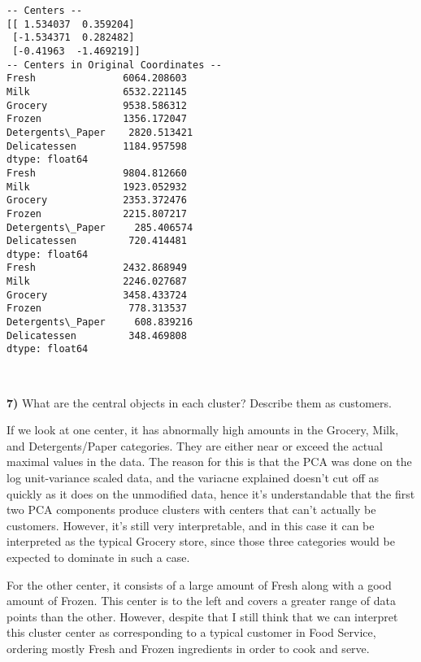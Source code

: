 \documentclass{article}
\begin{document}
    \begin{Verbatim}[commandchars=\\\{\}]
-- Centers --
[[ 1.534037  0.359204]
 [-1.534371  0.282482]
 [-0.41963  -1.469219]]
-- Centers in Original Coordinates --
Fresh               6064.208603
Milk                6532.221145
Grocery             9538.586312
Frozen              1356.172047
Detergents\_Paper    2820.513421
Delicatessen        1184.957598
dtype: float64
Fresh               9804.812660
Milk                1923.052932
Grocery             2353.372476
Frozen              2215.807217
Detergents\_Paper     285.406574
Delicatessen         720.414481
dtype: float64
Fresh               2432.868949
Milk                2246.027687
Grocery             3458.433724
Frozen               778.313537
Detergents\_Paper     608.839216
Delicatessen         348.469808
dtype: float64
    \end{Verbatim}

    \begin{center}
    \end{center}
    { \hspace*{\fill} \\}
    
    \textbf{7)} What are the central objects in each cluster? Describe them
as customers.

    If we look at one center, it has abnormally high amounts in the Grocery,
Milk, and Detergents/Paper categories. They are either near or exceed
the actual maximal values in the data. The reason for this is that the
PCA was done on the log unit-variance scaled data, and the variacne
explained doesn't cut off as quickly as it does on the unmodified data,
hence it's understandable that the first two PCA components produce
clusters with centers that can't actually be customers. However, it's
still very interpretable, and in this case it can be interpreted as the
typical Grocery store, since those three categories would be expected to
dominate in such a case.

For the other center, it consists of a large amount of Fresh along with
a good amount of Frozen. This center is to the left and covers a greater
range of data points than the other. However, despite that I still think
that we can interpret this cluster center as corresponding to a typical
customer in Food Service, ordering mostly Fresh and Frozen ingredients
in order to cook and serve.
\end{document}
